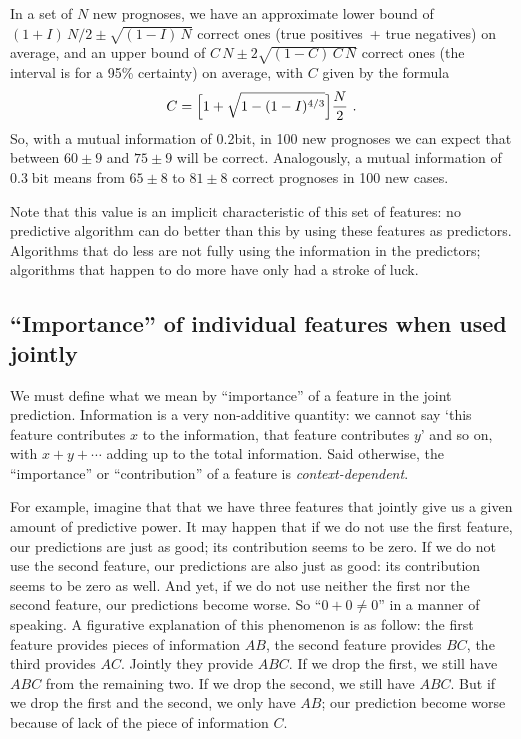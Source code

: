 \documentclass[\ifafour a4paper,12pt,\else a5paper,10pt,\fi%
onecolumn,oneside,article,%
british%
]{memoir}
\theoremstyle{remark}
\theoremstyle{innote}
\renewcommand*{\|}[1][]{\nonscript\:#1\vert\nonscript\:\mathopen{}}
\newcommand*{\bit}{\textrm{bit}}
\begin{document}
In a set of $N$ new prognoses, we have an approximate lower bound of
$(1+I)\,N/2 \pm \sqrt{(1-I)\,N}$ correct ones (true positives~+ true
negatives) on average, and an upper bound of $C\,N \pm 2\sqrt{(1-C)\,C\,N}$
correct ones (the interval is for a 95\% certainty) on average, with $C$
given by the formula
\begin{equation}
  \label{eq:mutualinfo_est}
 C = \Bigl[1+\sqrt{1-(1-I)^{4/3}}\Bigr]\frac{N}{2} \ .
\end{equation}
So, with a mutual information of 0.2\;\bit, in 100 new prognoses we can
expect  that between $60\pm 9$ and $75\pm 9$
will be correct. Analogously, a mutual information of $0.3\;\bit$ means
from $65 \pm 8$ to $81\pm 8$ correct prognoses in 100 new cases.

Note that this value is an implicit characteristic of this set of
features: no predictive algorithm can do better than this by using these
features as predictors. Algorithms that do less are not fully using the
information in the predictors; algorithms that happen to do more have only had a
stroke of luck.

\subsection{\enquote{Importance} of individual features when used jointly}
\label{sec:importance_features}

We must define what we mean by \enquote{importance} of a feature in the
joint prediction. Information is a very non-additive quantity: we cannot
say \enquote*{this feature contributes $x$ to the information, that feature
  contributes $y$} and so on, with $x+y+\dotsb$ adding up to the total
information. Said otherwise, the \enquote{importance} or
\enquote{contribution} of a feature is \emph{context-dependent}.

For example, imagine that that we have three features that jointly give us
a given amount of predictive power. It may happen that if we do not use the
first feature, our predictions are just as good; its contribution seems to
be zero. If we do not use the second feature, our predictions are also just
as good: its contribution seems to be zero as well. And yet, if we do not
use neither the first nor the second feature, our predictions become worse.
So \enquote{$0+0\ne 0$} in a manner of speaking. A figurative explanation
of this phenomenon is as follow: the first feature provides pieces of
information $AB$, the second feature provides $BC$, the third provides
$AC$. Jointly they provide $ABC$. If we drop the first, we still have $ABC$
from the remaining two. If we drop the second, we still have $ABC$. But if
we drop the first and the second, we only have $AB$; our prediction become
worse because of lack of the piece of information $C$.
\end{document}
